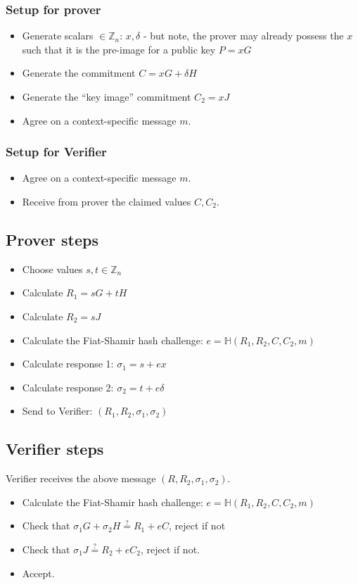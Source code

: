 \documentclass[10pt,a4paper]{article}
\begin{document}
\subsubsection{Setup for prover}
\begin{itemize}
\item Generate scalars $\in \mathbb{Z}_n$: $x, \delta$ - but note, the prover may already possess the $x$ such that it is the pre-image for a public key $P = xG$
\item Generate the commitment $C = xG + \delta H$
\item Generate the ``key image'' commitment $C_2 = xJ$
\item Agree on a context-specific message $m$.
\end{itemize}

\subsubsection{Setup for Verifier}
\begin{itemize}
\item Agree on a context-specific message $m$.
\item Receive from prover the claimed values $C, C_2$.
\end{itemize}


\subsection{Prover steps}

\begin{itemize}
\item Choose values $s, t \in \mathbb{Z}_n$
\item Calculate $R_1 = sG + tH$
\item Calculate $R_2 = sJ$
\item Calculate the Fiat-Shamir hash challenge: $e = \mathbb{H}(R_1, R_2, C, C_2, m)$
\item Calculate response 1: $\sigma_1 = s + ex$
\item Calculate response 2: $\sigma_2 = t + e\delta$
\item Send to Verifier: $\left(R_1, R_2, \sigma_1, \sigma_2\right)$
\end{itemize}

\subsection{Verifier steps}

Verifier receives the above message $\left(R, R_2, \sigma_1, \sigma_2\right)$.
\begin{itemize}
\item Calculate the Fiat-Shamir hash challenge: $e = \mathbb{H}(R_1, R_2, C, C_2, m)$
\item Check that $\sigma_1 G + \sigma_2 H \stackrel{?}{=} R_1 + eC$, reject if not
\item Check that $\sigma_1 J \stackrel{?}{=} R_2 + e C_2$, reject if not.
\item Accept.
\end{itemize}
\end{document}
